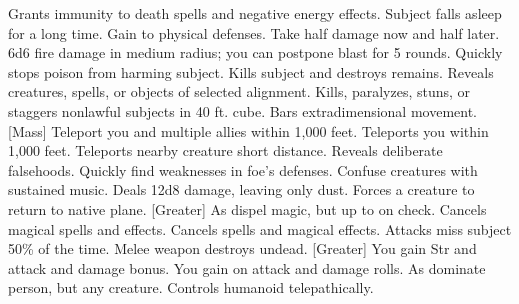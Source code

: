     {Grants immunity to death spells and negative energy effects.}
    {Subject falls asleep for a long time.}
    {Gain  to physical defenses.}
    {Take half damage now and half later. }
    {6d6 fire damage in medium radius; you can postpone blast for 5 rounds.}
    {Quickly stops poison from harming subject.}
    {Kills subject and destroys remains.}
    {Reveals creatures, spells, or objects of selected alignment.}
    {Kills, paralyzes, stuns, or staggers nonlawful subjects in 40 ft. cube.}
    {Bars extradimensional movement.}
[Mass]
    {Teleport you and multiple allies within 1,000 feet.}
    {Teleports you within 1,000 feet.}
    {Teleports nearby creature short distance.}
    {Reveals deliberate falsehoods.}
    {Quickly find weaknesses in foe's defenses.}
    {Confuse creatures with sustained music.}
    {Deals 12d8 damage, leaving only dust.}
    {Forces a creature to return to native plane.}
[Greater]
    {As dispel magic, but up to  on check.}
    {Cancels magical spells and effects.}
    {Cancels spells and magical effects.}
    {Attacks miss subject 50\% of the time.}
    {Melee weapon destroys undead.}
[Greater]
    {You gain  Str and attack and damage bonus.}
    {You gain  on attack and damage rolls.}
    {As dominate person, but any creature.}
    {Controls humanoid telepathically.}
